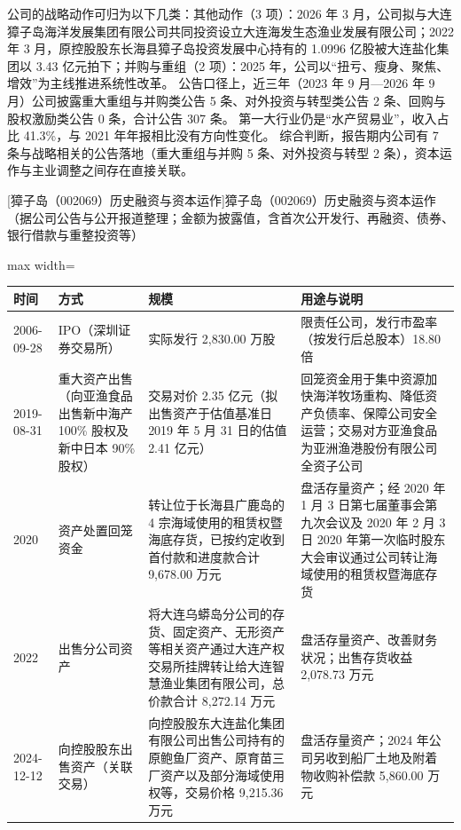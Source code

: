  公司的战略动作可归为以下几类：其他动作（3 项）：2026 年 3 月，公司拟与大连獐子岛海洋发展集团有限公司共同投资设立大连海发生态渔业发展有限公司；2022 年 3 月，原控股股东长海县獐子岛投资发展中心持有的 1.0996 亿股被大连盐化集团以 3.43 亿元拍下；并购与重组（2 项）：2025 年，公司以“扭亏、瘦身、聚焦、增效”为主线推进系统性改革。 公告口径上，近三年（2023 年 9 月---2026 年 9 月）公司披露重大重组与并购类公告 5 条、对外投资与转型类公告 2 条、回购与股权激励类公告 0 条，合计公告 307 条。 第一大行业仍是“水产贸易业”，收入占比 41.3\%，与 2021 年年报相比没有方向性变化。 综合判断，报告期内公司有 7 条与战略相关的公告落地（重大重组与并购 5 条、对外投资与转型 2 条），资本运作与主业调整之间存在直接关联。

\begin{center}\small\setlength{\tabcolsep}{4pt}
[獐子岛（002069）历史融资与资本运作]{獐子岛（002069）历史融资与资本运作（据公司公告与公开报道整理；金额为披露值，含首次公开发行、再融资、债券、银行借款与重整投资等）}
\begin{adjustbox}{max width=\textwidth}
\begin{tabular}{@{}p{1.45cm}p{2.55cm}p{4.05cm}p{4.95cm}@{}}
\toprule
时间 & 方式 & 规模 & 用途与说明 \\
\midrule
2006-09-28 & IPO（深圳证券交易所） & 实际发行 2,\allowbreak{}830.00 万股 & 限责任公司，\allowbreak{}发行市盈率（按发行后总股本）18.80 倍 \\
2019-08-31 & 重大资产出售（向亚渔食品出售新中海产 100\% 股权及新中日本 90\% 股权） & 交易对价 2.35 亿元（拟出售资产于估值基准日 2019 年 5 月 31 日的估值 2.41 亿元） & 回笼资金用于集中资源加快海洋牧场重构、\allowbreak{}降低资产负债率、\allowbreak{}保障公司安全运营；交易对方亚渔食品为亚洲渔港股份有限公司全资子公司 \\
2020 & 资产处置回笼资金 & 转让位于长海县广鹿岛的 4 宗海域使用的租赁权暨海底存货，\allowbreak{}已按约定收到首付款和进度款合计 9,\allowbreak{}678.00 万元 & 盘活存量资产；经 2020 年 1 月 3 日第七届董事会第九次会议及 2020 年 2 月 3 日 2020 年第一次临时股东大会审议通过公司转让海域使用的租赁权暨海底存货 \\
2022 & 出售分公司资产 & 将大连乌蟒岛分公司的存货、\allowbreak{}固定资产、\allowbreak{}无形资产等相关资产通过大连产权交易所挂牌转让给大连智慧渔业集团有限公司，\allowbreak{}总价款合计 8,\allowbreak{}272.14 万元 & 盘活存量资产、\allowbreak{}改善财务状况；出售存货收益 2,\allowbreak{}078.73 万元 \\
2024-12-12 & 向控股股东出售资产（关联交易） & 向控股股东大连盐化集团有限公司出售公司持有的原鲍鱼厂资产、\allowbreak{}原育苗三厂资产以及部分海域使用权等，\allowbreak{}交易价格 9,\allowbreak{}215.36 万元 & 盘活存量资产；2024 年公司另收到船厂土地及附着物收购补偿款 5,\allowbreak{}860.00 万元 \\

\end{tabular}
\end{adjustbox}
\end{center}
